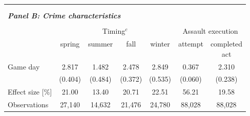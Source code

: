 \begin{table}[t]
\begin{threeparttable}
{\begin{tabular}{l*{6}{c}}
				\\\\\\
				\multicolumn{6}{l}{\textit{\textbf{Panel B: Crime characteristics}}} \\\\
				& \multicolumn{4}{c}{Timing$^c$} & \multicolumn{2}{c}{Assault execution} \\
				\cmidrule(lr){2-5} \cmidrule(lr){6-7}
				& spring & summer & fall & winter & attempt & \clb{c}{completed\\act} \\
				\midrule
				Game day            	 &     2.817\sym{***}&       1.482\sym{**} &       2.478\sym{***}&       2.849\sym{***}&       0.367\sym{***}&       2.310\sym{***}\\
										 &   (0.404)         &     (0.484)         &     (0.372)         &     (0.535)         &     (0.060)         &     (0.238)         \\
				Effect size [\%]&     21.00         &       13.40         &       20.71         &       22.51         &       56.21         &       19.58         \\
				Observations        	 &    27,140         &      14,632         &      21,476         &      24,780         &      88,028         &      88,028         \\
				

\end{tabular}}
\end{threeparttable}
\end{table}
